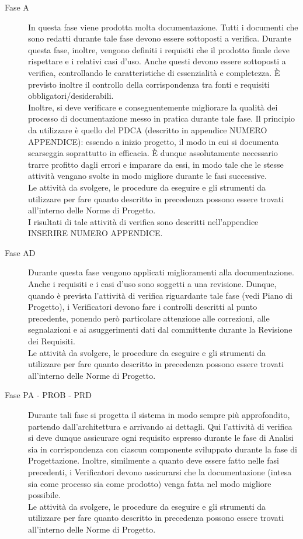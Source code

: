 	\begin{description}
		\item[Fase A] In questa fase viene prodotta molta documentazione. Tutti i documenti che sono redatti durante tale fase devono essere 
		sottoposti a verifica. Durante questa fase, inoltre, vengono definiti i requisiti che il prodotto finale deve rispettare e i relativi casi 
		d'uso. Anche questi devono essere sottoposti a verifica, controllando le caratteristiche di essenzialità e completezza. È previsto inoltre 
		il controllo della corrispondenza tra fonti e requisiti obbligatori/desiderabili.\\
		Inoltre, si deve verificare e conseguentemente migliorare la qualità dei processo di documentazione messo in pratica durante tale fase. Il 
		principio da utilizzare è quello del PDCA (descritto in appendice NUMERO APPENDICE): essendo a inizio progetto, il modo in cui si documenta 
		scarseggia soprattutto in efficacia. È dunque assolutamente necessario trarre profitto dagli errori e imparare da essi, in modo tale che le 
		stesse attività vengano svolte in modo migliore durante le fasi successive.\\
		Le attività da svolgere, le procedure da eseguire e gli strumenti da utilizzare per fare quanto descritto in precedenza possono essere trovati 
		all'interno delle Norme di Progetto.\\
		I risultati di tale attività di verifica sono descritti nell'appendice INSERIRE NUMERO APPENDICE.
		\item[Fase AD] Durante questa fase vengono applicati miglioramenti alla documentazione. Anche i requisiti e i casi d'uso 
		sono soggetti a una revisione. Dunque, quando è prevista l'attività di verifica riguardante tale fase (vedi Piano di Progetto), i Verificatori 
		devono fare i controlli descritti al punto precedente, ponendo però particolare attenzione alle correzioni, alle segnalazioni e ai asuggerimenti 
		dati dal committente durante la Revisione dei Requisiti.\\
		Le attività da svolgere, le procedure da eseguire e gli strumenti da utilizzare per fare quanto descritto in precedenza possono essere trovati 
		all'interno delle Norme di Progetto.\\
		\item[Fase PA - PROB - PRD] Durante tali fase si progetta il sistema in modo sempre più approfondito, partendo dall'architettura e arrivando 
		ai dettagli. Qui l'attività di verifica si deve dunque assicurare ogni requisito espresso durante le fase di Analisi sia in corrispondenza con 
		ciascun componente sviluppato durante la fase di Progettazione. Inoltre, similmente a quanto deve essere fatto nelle fasi precedenti, i Verificatori 
		devono assicurarsi che la documentazione (intesa sia come processo sia come prodotto) venga fatta nel modo migliore possibile.\\
		Le attività da svolgere, le procedure da eseguire e gli strumenti da utilizzare per fare quanto descritto in precedenza possono essere trovati 
		all'interno delle Norme di Progetto.\\
	\end{description}
